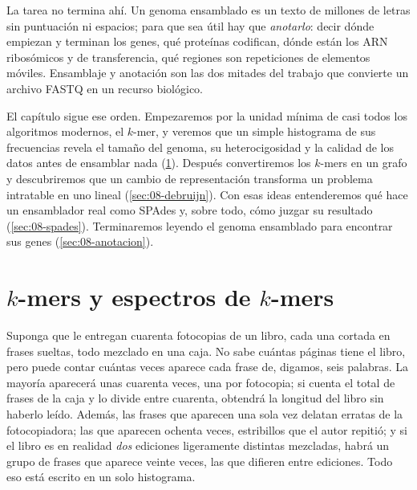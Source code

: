 La tarea no termina ahí. Un genoma ensamblado es un texto de millones de letras sin puntuación ni espacios; para que sea útil hay que \emph{anotarlo}: decir dónde empiezan y terminan los genes, qué proteínas codifican, dónde están los ARN ribosómicos y de transferencia, qué regiones son repeticiones de elementos móviles. Ensamblaje y anotación son las dos mitades del trabajo que convierte un archivo FASTQ en un recurso biológico.

El capítulo sigue ese orden. Empezaremos por la unidad mínima de casi todos los algoritmos modernos, el $k$-mer, y veremos que un simple histograma de sus frecuencias revela el tamaño del genoma, su heterocigosidad y la calidad de los datos antes de ensamblar nada (\cref{sec:08-kmers}). Después convertiremos los $k$-mers en un grafo y descubriremos que un cambio de representación transforma un problema intratable en uno lineal (\cref{sec:08-debruijn}). Con esas ideas entenderemos qué hace un ensamblador real como SPAdes y, sobre todo, cómo juzgar su resultado (\cref{sec:08-spades}). Terminaremos leyendo el genoma ensamblado para encontrar sus genes (\cref{sec:08-anotacion}).

\section{\texorpdfstring{$k$}{k}-mers y espectros de \texorpdfstring{$k$}{k}-mers}\label{sec:08-kmers}

\begin{intuicion}
Suponga que le entregan cuarenta fotocopias de un libro, cada una cortada en frases sueltas, todo mezclado en una caja. No sabe cuántas páginas tiene el libro, pero puede contar cuántas veces aparece cada frase de, digamos, seis palabras. La mayoría aparecerá unas cuarenta veces, una por fotocopia; si cuenta el total de frases de la caja y lo divide entre cuarenta, obtendrá la longitud del libro sin haberlo leído. Además, las frases que aparecen una sola vez delatan erratas de la fotocopiadora; las que aparecen ochenta veces, estribillos que el autor repitió; y si el libro es en realidad \emph{dos} ediciones ligeramente distintas mezcladas, habrá un grupo de frases que aparece veinte veces, las que difieren entre ediciones. Todo eso está escrito en un solo histograma.
\end{intuicion}

